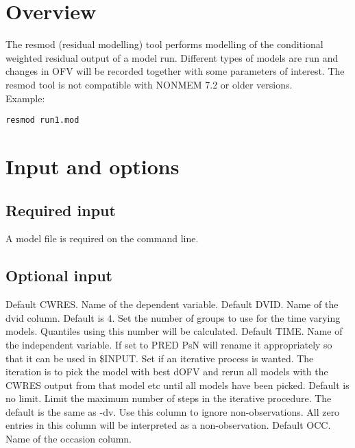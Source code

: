 



\maketitle
\newcommand{\guidetoolname}{resmod}


\section{Overview}
The resmod (residual modelling) tool performs modelling of the conditional weighted residual output of a model run. Different types of models are run and changes in OFV will be recorded together with some parameters of interest. The resmod tool is not compatible with NONMEM 7.2 or older versions.\\
Example:
\begin{verbatim}
resmod run1.mod
\end{verbatim}

\section{Input and options}

\subsection{Required input}
A model file is required on the command line.

\subsection{Optional input}

\begin{optionlist}
Default CWRES. Name of the dependent variable. 
\nextopt
{}
Default DVID. Name of the dvid column. 
\nextopt
{}
Default is 4. Set the number of groups to use for the time varying models. Quantiles using this number will be calculated.
\nextopt
{}
Default TIME. Name of the independent variable. If set to PRED PsN will rename it appropriately so that it can be used in \$INPUT.
\nextopt
{}
Set if an iterative process is wanted. The iteration is to pick the model with best dOFV and rerun all models with the CWRES output from that model etc until all models have been picked.
\nextopt
{}
Default is no limit. Limit the maximum number of steps in the iterative procedure. 
\nextopt
{}
The default is the same as -dv. Use this column to ignore non-observations. All zero entries in this column will be interpreted as a non-observation.
\nextopt
{}
Default OCC. Name of the occasion column. 
\nextopt
\end{optionlist}

